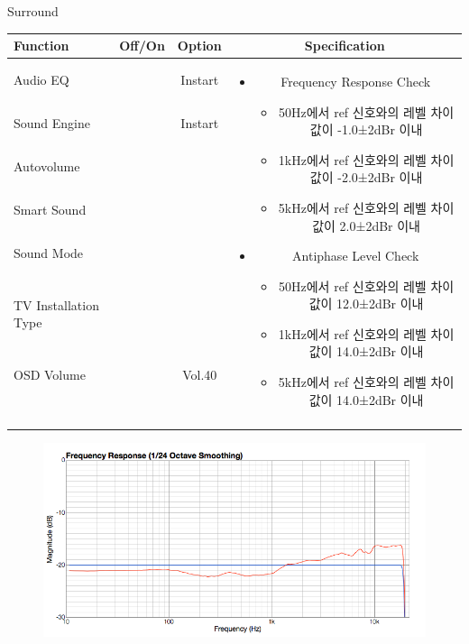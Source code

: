 \begin{frame}[t]{Surround}
\begin{tiny}
\begin{tabular}{@{}lccc@{}}
\toprule
Function & Off/On & Option & Specification \\
\midrule
Audio EQ & \color{black}{Off} & Instart &
\multirow{10}{60mm}{
\begin{itemize}\vspace{-3mm}
\item Frequency Response Check
	\begin{itemize}
		\item 50Hz에서 ref 신호와의 레벨 차이값이 -1.0±2dBr 이내
		\item 1kHz에서 ref 신호와의 레벨 차이값이 -2.0±2dBr 이내
		\item 5kHz에서 ref 신호와의 레벨 차이값이 2.0±2dBr 이내	
	\end{itemize}
\item Antiphase Level Check
	\begin{itemize}
		\item 50Hz에서 ref 신호와의 레벨 차이값이 12.0±2dBr 이내
		\item 1kHz에서 ref 신호와의 레벨 차이값이 14.0±2dBr 이내
		\item 5kHz에서 ref 신호와의 레벨 차이값이 14.0±2dBr 이내
	\end{itemize}
\end{itemize}
} \\
Sound Engine & \color{blue}{On} & Instart & \\
Autovolume & \color{black}{Off} & & \\
Smart Sound & \color{black}{Off} & & \\
Sound Mode & \color{blue}{On} & \color{blue}{Surround} & \\
TV Installation Type & \color{blue}{On} & \color{black}{Standtype1} & \\
OSD Volume & \color{blue}{On} & Vol.40 & \\
& & & \\
& & & \\
& & & \\
& & & \\
\midrule
\end{tabular}
\end{tiny}

\begin{figure}[b]
\includegraphics[height=0.4\textwidth]{figures/surround.png}
\end{figure}

\end{frame}
